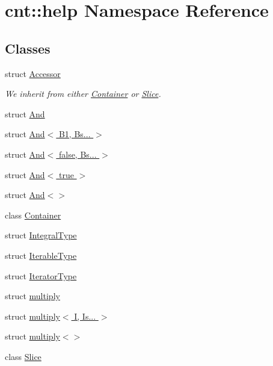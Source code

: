 \hypertarget{namespacecnt_1_1help}{}\section{cnt\+:\+:help Namespace Reference}
\label{namespacecnt_1_1help}
\subsection*{Classes}
\begin{DoxyCompactItemize}
\item 
struct \hyperlink{structcnt_1_1help_1_1Accessor}{Accessor}
\begin{DoxyCompactList}\small\item\em We inherit from either \textquotesingle{}\hyperlink{classcnt_1_1help_1_1Container}{Container}\textquotesingle{} or \textquotesingle{}\hyperlink{classcnt_1_1help_1_1Slice}{Slice}\textquotesingle{}. \end{DoxyCompactList}\item 
struct \hyperlink{structcnt_1_1help_1_1And}{And}
\item 
struct \hyperlink{structcnt_1_1help_1_1And_3_01B1_00_01Bs_8_8_8_01_4}{And$<$ B1, Bs... $>$}
\item 
struct \hyperlink{structcnt_1_1help_1_1And_3_01false_00_01Bs_8_8_8_01_4}{And$<$ false, Bs... $>$}
\item 
struct \hyperlink{structcnt_1_1help_1_1And_3_01true_01_4}{And$<$ true $>$}
\item 
struct \hyperlink{structcnt_1_1help_1_1And_3_4}{And$<$$>$}
\item 
class \hyperlink{classcnt_1_1help_1_1Container}{Container}
\item 
struct \hyperlink{structcnt_1_1help_1_1IntegralType}{Integral\+Type}
\item 
struct \hyperlink{structcnt_1_1help_1_1IterableType}{Iterable\+Type}
\item 
struct \hyperlink{structcnt_1_1help_1_1IteratorType}{Iterator\+Type}
\item 
struct \hyperlink{structcnt_1_1help_1_1multiply}{multiply}
\item 
struct \hyperlink{structcnt_1_1help_1_1multiply_3_01I_00_01Is_8_8_8_01_4}{multiply$<$ I, Is... $>$}
\item 
struct \hyperlink{structcnt_1_1help_1_1multiply_3_4}{multiply$<$$>$}
\item 
class \hyperlink{classcnt_1_1help_1_1Slice}{Slice}
\end{DoxyCompactItemize}
